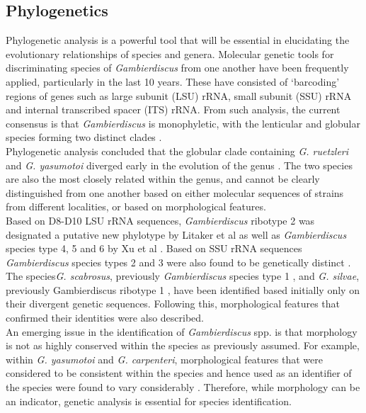 \documentclass[12pt]{article}
\begin{document}
\subsection{Phylogenetics}

Phylogenetic analysis is a powerful tool that will be essential in elucidating the evolutionary relationships of species and genera. Molecular genetic tools for discriminating species of \emph{Gambierdiscus} from one another have been frequently applied, particularly in the last 10 years. These have consisted of ‘barcoding’ regions of genes such as large subunit (LSU) rRNA, small subunit (SSU) rRNA and internal transcribed spacer (ITS) rRNA. From such analysis, the current consensus is that \emph{Gambierdiscus} is monophyletic, with the lenticular and globular species forming two distinct clades \cite{chinain1999morphology,litaker2009taxonomy,fraga2011gambierdiscus,richlen2008phylogeography,kuno2010genetic,litaker2010global,nishimura2013genetic}. \\

Phylogenetic analysis concluded that the globular clade containing \emph{G. ruetzleri} and \emph{G. yasumotoi} diverged early in the evolution of the genus \cite{litaker2009taxonomy,nishimura2013genetic}. The two species are also the most closely related within the genus, and cannot be clearly distinguished from one another based on either molecular sequences of strains from different localities, or based on morphological features. \\

Based on D8-D10 LSU rRNA sequences, \emph{Gambierdiscus} ribotype 2 was designated a putative new phylotype by Litaker et al \cite{litaker2010global} as well as \emph{Gambierdiscus} species type 4, 5 and 6 by Xu et al \cite{xu2014distribution}. Based on SSU rRNA sequences \emph{Gambierdiscus} species types 2 and 3 were also found to be genetically distinct \cite{nishimura2013genetic,kuno2010genetic}. The species\emph{G. scabrosus}, previously \emph{Gambierdiscus} species type 1 \cite{nishimura2013genetic,nishimura2014morphology},  and \emph{G. silvae}, previously Gambierdiscus ribotype 1 \cite{fraga2014genus}, have been identified based initially only on their divergent genetic sequences. Following this, morphological features that confirmed their identities were also described. \\

An emerging issue in the identification of \emph{Gambierdiscus} spp. is that morphology is not as highly conserved within the species as previously assumed. For example, within \emph{G. yasumotoi} and \emph{G. carpenteri}, morphological features that were considered to be consistent within the species and hence used as an identifier of the species were found to vary considerably \cite{murray2014molecular,kohli2014high}. Therefore, while morphology can be an indicator, genetic analysis is essential for species identification.
\end{document}

